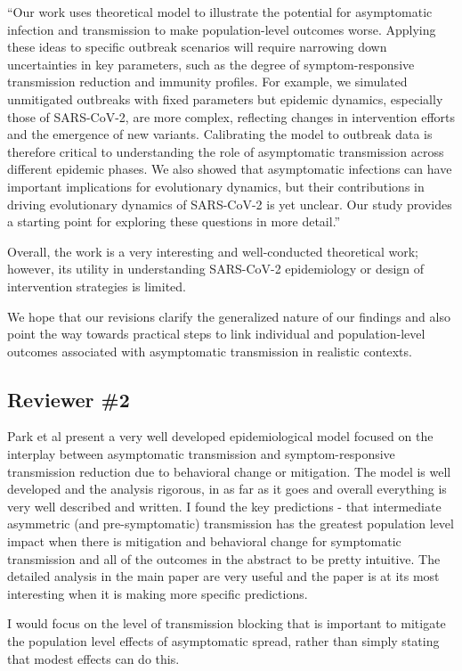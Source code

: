 \documentclass[12pt]{article}
\newcommand{\rev}{\subsection*}
\newcommand{\revtext}{\textsf}
\begin{document}
``Our work uses theoretical model to illustrate the potential for asymptomatic infection and transmission to make population-level outcomes worse.
Applying these ideas to specific outbreak scenarios will require narrowing down uncertainties in key parameters, such as the degree of symptom-responsive transmission reduction and immunity profiles.
For example, we simulated unmitigated outbreaks with fixed parameters but epidemic dynamics, especially those of SARS-CoV-2, are more complex, reflecting changes in intervention efforts and the emergence of new variants.
Calibrating the model to outbreak data is therefore critical to understanding the role of asymptomatic transmission across different epidemic phases.
We also showed that asymptomatic infections can have important implications for evolutionary dynamics, but their contributions in driving evolutionary dynamics of SARS-CoV-2 is yet unclear.
Our study provides a starting point for exploring these questions in more detail.''

\revtext{Overall, the work is a very interesting and well-conducted theoretical work; however, its utility in understanding SARS-CoV-2 epidemiology or design of intervention strategies is limited.}

We hope that our revisions clarify the generalized nature of our findings and also point the way towards practical steps to link individual and population-level outcomes associated with asymptomatic transmission in realistic contexts. 


\rev{Reviewer \#2}

\revtext{Park et al present a very well developed epidemiological model focused on the interplay between asymptomatic transmission and symptom-responsive transmission reduction due to behavioral change or mitigation. The model is well developed and the analysis rigorous, in as far as it goes and overall everything is very well described and written. I found the key predictions - that intermediate asymmetric (and pre-symptomatic) transmission has the greatest population level impact when there is mitigation and behavioral change for symptomatic transmission and all of the outcomes in the abstract to be pretty intuitive. The detailed analysis in the main paper are very useful and the paper is at its most interesting when it is making more specific predictions.}

\revtext{I would focus on the level of transmission blocking that is important to mitigate the population level effects of asymptomatic spread, rather than simply stating that modest effects can do this.}
\end{document}
